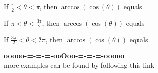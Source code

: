 \documentclass{ximera}
\begin{document}
\begin{question}


If $\frac{\pi}{2} < \theta < \pi$, then $\arccos(\cos(\theta))$ equals

\begin{multipleChoice}
\choice[correct] {$\theta$}
\choice {$\pi - \theta$}
\choice {$\pi + \theta$}
\choice {$2\pi - \theta$}
\end{multipleChoice}

\end{question}






\begin{question}


If $\pi < \theta < \frac{3\pi}{2}$, then $\arccos(\cos(\theta))$ equals

\begin{multipleChoice}
\choice {$\theta$}
\choice {$\pi - \theta$}
\choice {$\pi + \theta$}
\choice[correct] {$2\pi - \theta$}
\end{multipleChoice}

\end{question}






\begin{question}


If $\frac{3\pi}{2} < \theta < 2\pi$, then $\arccos(\cos(\theta))$ equals

\begin{multipleChoice}
\choice {$\theta$}
\choice {$\pi - \theta$}
\choice {$\pi + \theta$}
\choice[correct] {$2\pi - \theta$}
\end{multipleChoice}

\end{question}










\begin{center}
\textbf{\textcolor{green!50!black}{ooooo-=-=-=-ooOoo-=-=-=-ooooo}} \\

more examples can be found by following this link\\ 

\end{center}
\end{document}
